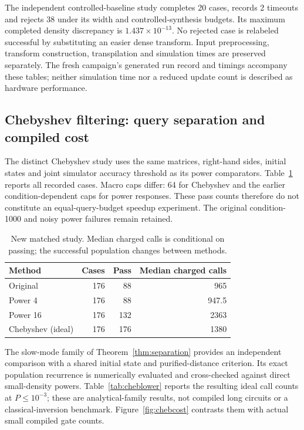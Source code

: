 \documentclass{ieeeaccess}
\begin{document}
The independent controlled-baseline study completes 20 cases, records 2 timeouts and rejects 38 under its width and controlled-synthesis budgets. Its maximum completed density discrepancy is $1.437\times10^{-13}$. No rejected case is relabeled successful by substituting an easier dense transform. Input preprocessing, transform construction, transpilation and simulation times are preserved separately. The fresh campaign's generated run record and timings accompany these tables; neither simulation time nor a reduced update count is described as hardware performance.



\subsection{Chebyshev filtering: query separation and compiled cost}
The distinct Chebyshev study uses the same matrices, right-hand sides, initial states and joint simulator accuracy threshold as its power comparators. Table~\ref{tab:chebstatic} reports all recorded cases. Macro caps differ: 64 for Chebyshev and the earlier condition-dependent caps for power responses. These pass counts therefore do not constitute an equal-query-budget speedup experiment. The original condition-1000 and noisy power failures remain retained.
\begin{table}[!tbp]\centering\caption{New matched study. Median charged calls is conditional on passing; the successful population changes between methods.}\label{tab:chebstatic}
\begin{tabular}{lrrr}\toprule
Method & Cases & Pass & Median charged calls\\\midrule
Original & 176 & 88 & 965\\
Power 4 & 176 & 88 & 947.5\\
Power 16 & 176 & 132 & 2363\\
Chebyshev (ideal) & 176 & 176 & 1380\\
\bottomrule\end{tabular}

\end{table}
The slow-mode family of Theorem~\ref{thm:separation} provides an independent comparison with a shared initial state and purified-distance criterion. Its exact population recurrence is numerically evaluated and cross-checked against direct small-density powers. Table~\ref{tab:cheblower} reports the resulting ideal call counts at $P\le10^{-3}$; these are analytical-family results, not compiled long circuits or a classical-inversion benchmark. Figure~\ref{fig:chebcost} contrasts them with actual small compiled gate counts.
\end{document}
